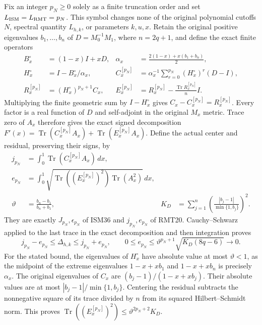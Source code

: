 Fix an integer $p_N\ge0$ solely as a finite truncation order and set
$L_{\rm ISM}=L_{\rm RMT}=p_N$. This symbol changes none of the original
polynomial cutoffs $N$, spectral quantity $L_{h,k}$, or parameters $k,u,x$.
Retain the original positive eigenvalues $b_1,\ldots,b_n$ of
$D=M_0^{-1}M_1$, where $n=2q+1$, and define the exact finite operators
\[
 \begin{aligned}
 B_x^\circ&=(1-x)I+xD,&
 \alpha_x&=\frac{2(1-x)+x(b_1+b_n)}2,\\
 H_x^\circ&=I-B_x^\circ/\alpha_x,&
 C_x^{[p_N]}&=\alpha_x^{-1}\sum_{r=0}^{p_N}(H_x^\circ)^r(D-I),\\
 R_x^{[p_N]}&=(H_x^\circ)^{p_N+1}C_x,&
 E_x^{[p_N]}&=R_x^{[p_N]}-\frac{\operatorname{Tr}R_x^{[p_N]}}n I.
 \end{aligned}\tag{FV.M16a}\label{fvmetric:signed-construction}
\]
Multiplying the finite geometric sum by $I-H_x^\circ$ gives
$C_x-C_x^{[p_N]}=R_x^{[p_N]}$. Every factor is a real function of
$D$ and self-adjoint in the original $M_x$ metric. Trace zero of
$A_x$ therefore gives the exact signed decomposition
$F'(x)=\operatorname{Tr}(C_x^{[p_N]}A_x)+
\operatorname{Tr}(E_x^{[p_N]}A_x)$.
Define the actual center and residual, preserving their signs, by
\[
 \begin{aligned}
 j_{p_N}&=\int_0^1\operatorname{Tr}(C_x^{[p_N]}A_x)\,dx,\\
 e_{p_N}&=\int_0^1
 \sqrt{\operatorname{Tr}((E_x^{[p_N]})^2)\operatorname{Tr}(A_x^2)}\,dx,\\
 \vartheta&=\frac{b_n-b_1}{b_n+b_1},&
 K_D&=\sum_{j=1}^n\left(\frac{|b_j-1|}{\min\{1,b_j\}}\right)^2.
 \end{aligned}\tag{FV.M16b}\label{fvmetric:signed-center}
\]
They are exactly $J_{p_N},\epsilon_{p_N}$ of ISM36 and
$j_{p_N},e_{p_N}$ of RMT20. Cauchy--Schwarz applied to the last
trace in the exact decomposition and then integration proves
\[
 j_{p_N}-e_{p_N}\le\Delta_{h,k}\le j_{p_N}+e_{p_N},\qquad
 0\le e_{p_N}\le\vartheta^{p_N+1}\sqrt{K_D(8q-6)}
                 \longrightarrow0.
 \tag{FV.M16c}\label{fvmetric:signed-error}
\]
For the stated bound, the eigenvalues of $H_x^\circ$ have absolute
value at most $\vartheta<1$, as the midpoint of the extreme eigenvalues
$1-x+xb_1$ and $1-x+xb_n$ is precisely $\alpha_x$.
The original eigenvalues of $C_x$ are $(b_j-1)/(1-x+xb_j)$.
Their absolute values are at most $|b_j-1|/\min\{1,b_j\}$.
Centering the residual subtracts the nonnegative square of its trace
divided by $n$ from its squared Hilbert--Schmidt norm. This proves
$\operatorname{Tr}((E_x^{[p_N]})^2)\le\vartheta^{2p_N+2}K_D$.
